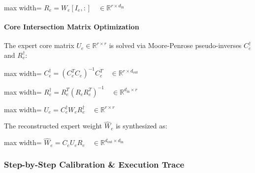 \begin{center}
\begin{adjustbox}{max width=\columnwidth}
$\displaystyle
R_e = W_e[I_e, :] \quad \in \mathbb{R}^{r \times d_{\text{in}}}
$
\end{adjustbox}
\end{center}

\paragraph{Core Intersection Matrix Optimization}
The expert core matrix $U_e \in \mathbb{R}^{r \times r}$ is solved via Moore-Penrose pseudo-inverses $C_e^\dagger$ and $R_e^\dagger$:

\begin{center}
\begin{adjustbox}{max width=\columnwidth}
$\displaystyle
C_e^\dagger = (C_e^T C_e)^{-1} C_e^T \quad \in \mathbb{R}^{r \times d_{\text{out}}}
$
\end{adjustbox}
\end{center}

\begin{center}
\begin{adjustbox}{max width=\columnwidth}
$\displaystyle
R_e^\dagger = R_e^T (R_e R_e^T)^{-1} \quad \in \mathbb{R}^{d_{\text{in}} \times r}
$
\end{adjustbox}
\end{center}

\begin{center}
\begin{adjustbox}{max width=\columnwidth}
$\displaystyle
U_e = C_e^\dagger W_e R_e^\dagger \quad \in \mathbb{R}^{r \times r}
$
\end{adjustbox}
\end{center}

The reconstructed expert weight $\hat{W}_e$ is synthesized as:

\begin{center}
\begin{adjustbox}{max width=\columnwidth}
$\displaystyle
\hat{W}_e = C_e U_e R_e \quad \in \mathbb{R}^{d_{\text{out}} \times d_{\text{in}}}
$
\end{adjustbox}
\end{center}


\subsubsection*{Step-by-Step Calibration \& Execution Trace}

